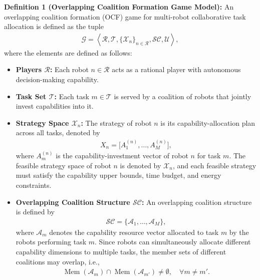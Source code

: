 \documentclass[journal,twoside,web]{ieeecolor}
\begin{document}
\textbf{Definition 1 (Overlapping Coalition Formation Game Model):}
An overlapping coalition formation (OCF) game for multi-robot collaborative task allocation is defined as the tuple
\begin{align}
\mathcal{G}
=
\left\langle
\mathcal{R},
\mathcal{T},
\{\mathcal{X}_n\}_{n\in\mathcal{R}},
\mathcal{SC},
\mathcal{U}
\right\rangle,
\end{align}
where the elements are defined as follows:

\begin{itemize}
    \item \textbf{Players $\mathcal{R}$:}
    Each robot $n\in\mathcal{R}$ acts as a rational player with autonomous decision-making capability.

    \item \textbf{Task Set $\mathcal{T}$:}
    Each task $m\in\mathcal{T}$ is served by a coalition of robots that jointly invest capabilities into it.

    \item \textbf{Strategy Space $\mathcal{X}_n$:}
    The strategy of robot $n$ is its capability-allocation plan across all tasks, denoted by
    \begin{align}
    X_n=\bigl[A_1^{(n)},\dots,A_M^{(n)}\bigr],
    \end{align}
    where $A_m^{(n)}$ is the capability-investment vector of robot $n$ for task $m$. The feasible strategy space of robot $n$ is denoted by $\mathcal{X}_n$, and each feasible strategy must satisfy the capability upper bounds, time budget, and energy constraints.



    \item \textbf{Overlapping Coalition Structure $\mathcal{SC}$:}
An overlapping coalition structure is defined by 
\begin{align}
\mathcal{SC}=\{\mathcal{A}_1,\dots,\mathcal{A}_M\},
\end{align}
where $\mathcal{A}_m$ denotes the capability resource vector allocated to task $m$ by the robots performing task $m$. Since robots can simultaneously allocate different capability dimensions to multiple tasks, the member sets of different coalitions may overlap, i.e.,
\begin{align}
\operatorname{Mem}(\mathcal{A}_m)\cap\operatorname{Mem}(\mathcal{A}_{m'})\neq\emptyset,\quad \forall m\neq m'.
\end{align}


\end{itemize}
\end{document}
